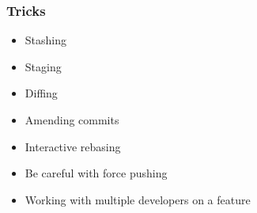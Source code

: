 \begin{frame}
	\frametitle{Tricks}
	\begin{itemize}[<+-| highlight@+>]
		\item Stashing
		\item Staging
		\item Diffing
		\item Amending commits
		\item Interactive rebasing
		\item Be careful with force pushing
		\item Working with multiple developers on a feature
	\end{itemize}
\end{frame}


